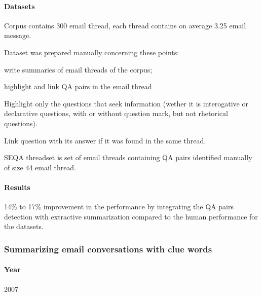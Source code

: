 \paragraph{Datasets}
\begin{my_itemize}
  \item Corpus contains 300 email thread, each thread contains on average 3.25 email message.
  \item Dataset was prepared manually concerning these points:
  \begin{my_itemize}
    \item write summaries of email threads of the corpus;
    \item highlight and link QA pairs in the email thread
    \begin{my_itemize}
      \item Highlight only the questions that seek information (wether it is 
	    interogative or declarative questions, with or without question mark, 
	    but not rhetorical questions).
      \item Link question with its answer if it was found in the same thread.
    \end{my_itemize}
  \end{my_itemize}
  \item SEQA threadset is set of email threads containing QA pairs identified manually of size 44 email thread.
\end{my_itemize}

\paragraph{Results}
\begin{my_itemize}
  \item 14\% to 17\% improvement in the performance by integrating the QA pairs 
	detection with extractive summarization compared to the human performance
	for the datasets.
\end{my_itemize}


\subsubsection{Summarizing email conversations with clue words \cite{GIUSEPPE07}}

\paragraph{Year} 2007
